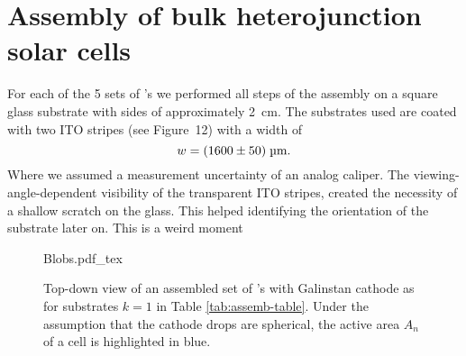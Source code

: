 \section{Assembly of bulk heterojunction solar cells}\label{sec:assembly}
For each of the 5 sets of \BHSC's we performed all steps of the assembly on a square glass substrate with sides of approximately 2~cm. The substrates used are coated with two ITO stripes (see \cite{labdesc} Figure~12) with a width of
\begin{equation*}
w = (1600\pm50)\;\text{\textmu m}.
\end{equation*}
Where we assumed a measurement uncertainty of an analog caliper. The viewing-angle-dependent visibility of the transparent ITO stripes, created the necessity of a shallow scratch on the glass. This helped identifying the orientation of the substrate later on.\mypar
This is a weird moment

\begin{figure}[h]\centering
{Blobs.pdf_tex}
\caption{Top-down view of an assembled set of \BHSC's with Galinstan cathode as for substrates $k=1$ in Table \ref{tab:assemb-table}. Under the assumption that the cathode drops are spherical, the active area $A_n$ of a cell is highlighted in blue.}
\label{fig:blobs}
\end{figure}


